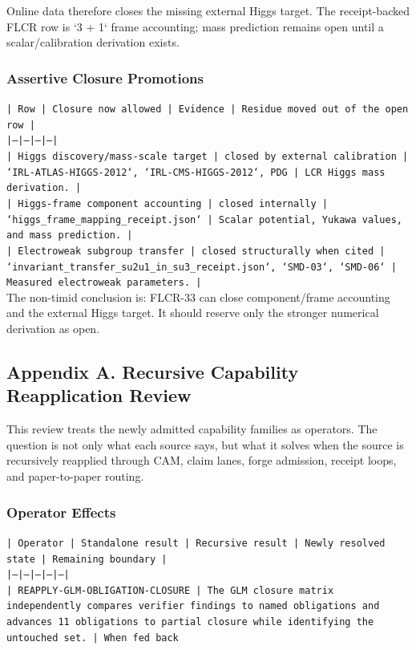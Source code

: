 \documentclass[11pt]{article}
\begin{document}
Online data therefore closes the missing external Higgs target. The receipt-backed FLCR row is `3 + 1` frame accounting; mass prediction remains open until a scalar/calibration derivation exists.

\subsubsection*{Assertive Closure Promotions}

\noindent\texttt{| Row | Closure now allowed | Evidence | Residue moved out of the open row |}\\
\noindent\texttt{|---|---|---|---|}\\
\noindent\texttt{| Higgs discovery/mass-scale target | closed by external calibration | `IRL-ATLAS-HIGGS-2012`, `IRL-CMS-HIGGS-2012`, PDG | LCR Higgs mass derivation. |}\\
\noindent\texttt{| Higgs-frame component accounting | closed internally | `higgs\_frame\_mapping\_receipt.json` | Scalar potential, Yukawa values, and mass prediction. |}\\
\noindent\texttt{| Electroweak subgroup transfer | closed structurally when cited | `invariant\_transfer\_su2u1\_in\_su3\_receipt.json`, `SMD-03`, `SMD-06` | Measured electroweak parameters. |}\\

The non-timid conclusion is: FLCR-33 can close component/frame accounting and the external Higgs target. It should reserve only the stronger numerical derivation as open.

\subsection*{Appendix A. Recursive Capability Reapplication Review}

This review treats the newly admitted capability families as operators. The question is not only what each source says, but what it solves when the source is recursively reapplied through CAM, claim lanes, forge admission, receipt loops, and paper-to-paper routing.

\subsubsection*{Operator Effects}

\noindent\texttt{| Operator | Standalone result | Recursive result | Newly resolved state | Remaining boundary |}\\
\noindent\texttt{|---|---|---|---|---|}\\
\noindent\texttt{| REAPPLY-GLM-OBLIGATION-CLOSURE | The GLM closure matrix independently compares verifier findings to named obligations and advances 11 obligations to partial closure while identifying the untouched set. | When fed back }\\
\end{document}
